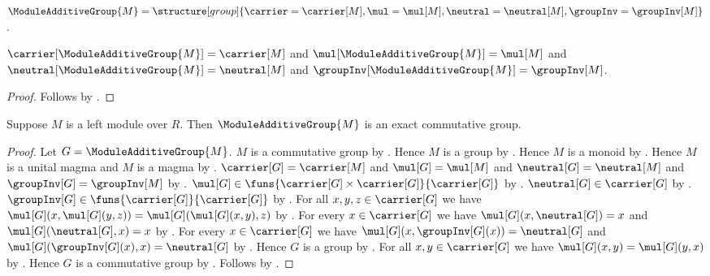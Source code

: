 \begin{definition}\label{module_additive_group}
    $\ModuleAdditiveGroup{M}=
        \structure[group]{
            \carrier=\carrier[M],
            \mul=\mul[M],
            \neutral=\neutral[M],
            \groupInv=\groupInv[M]
        }$.
\end{definition}

\begin{proposition}\label{module_additive_group_fields}
    $\carrier[\ModuleAdditiveGroup{M}]=\carrier[M]$ and
    $\mul[\ModuleAdditiveGroup{M}]=\mul[M]$ and
    $\neutral[\ModuleAdditiveGroup{M}]=\neutral[M]$ and
    $\groupInv[\ModuleAdditiveGroup{M}]=\groupInv[M]$.
\end{proposition}
\begin{proof}
    Follows by
        .
\end{proof}

\begin{theorem}\label{module_additive_group_is_exact_commutative_group}
    Suppose $M$ is a left module over $R$.
    Then $\ModuleAdditiveGroup{M}$ is an exact commutative group.
\end{theorem}
\begin{proof}
    Let $G=\ModuleAdditiveGroup{M}$.
    $M$ is a commutative group by
        .
    Hence $M$ is a group by .
    Hence $M$ is a monoid by .
    Hence $M$ is a unital magma and $M$ is a magma by
        .
    $\carrier[G]=\carrier[M]$ and $\mul[G]=\mul[M]$ and
        $\neutral[G]=\neutral[M]$ and
        $\groupInv[G]=\groupInv[M]$ by
        .
    $\mul[G]\in\funs{\carrier[G]\times\carrier[G]}{\carrier[G]}$ by
        .
    $\neutral[G]\in\carrier[G]$ by .
    $\groupInv[G]\in\funs{\carrier[G]}{\carrier[G]}$ by
        .
    For all $x,y,z\in\carrier[G]$ we have
        $\mul[G](x,\mul[G](y,z))=\mul[G](\mul[G](x,y),z)$ by
        .
    For every $x\in\carrier[G]$ we have
        $\mul[G](x,\neutral[G])=x$ and
        $\mul[G](\neutral[G],x)=x$ by
        .
    For every $x\in\carrier[G]$ we have
        $\mul[G](x,\groupInv[G](x))=\neutral[G]$ and
        $\mul[G](\groupInv[G](x),x)=\neutral[G]$ by
        .
    Hence $G$ is a group by
        .
    For all $x,y\in\carrier[G]$ we have
        $\mul[G](x,y)=\mul[G](y,x)$ by
        .
    Hence $G$ is a commutative group by
        .
    Follows by
        .
\end{proof}

